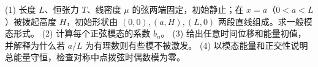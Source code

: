 (1) 长度 \(L\)、恒张力 \(T\)、线密度 \(\mu\) 的弦两端固定，初始静止；在 \(x=a\)（\(0<a<L\)）被拨起高度 \(H\)，初始形状由 \((0,0),(a,H),(L,0)\) 两段直线组成。求一般模态形式。
(2) 计算每个正弦模态的系数 \(b_n\)。
(3) 给出任意时间位移和能量初值，并解释为什么若 \(a/L\) 为有理数则有些模不被激发。
(4) 以模态能量和正交性说明总能量守恒，检查对称中点拨弦时偶数模为零。
